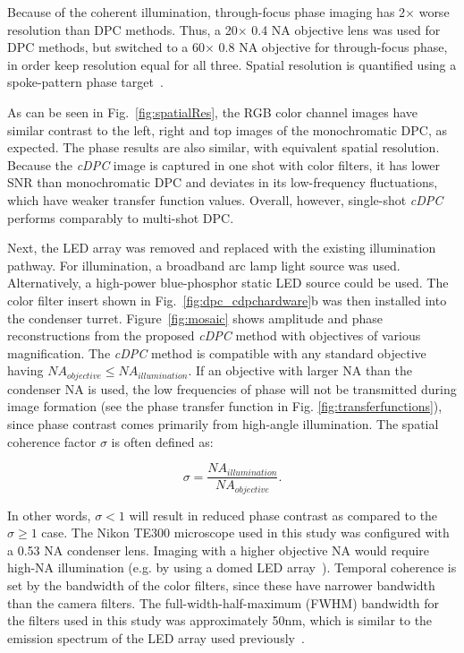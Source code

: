 Because of the coherent illumination, through-focus phase imaging has 2$\times$ worse resolution than DPC methods. Thus, a 20$\times$ 0.4 NA objective lens was used for DPC methods, but switched to a 60$\times$ 0.8 NA objective for through-focus phase, in order keep resolution equal for all three. Spatial resolution is quantified using a spoke-pattern phase target~\cite{standardphaseresolution2016}.

As can be seen in Fig.~\ref{fig:spatialRes}, the RGB color channel images have similar contrast to the left, right and top images of the monochromatic DPC, as expected. The phase results are also similar, with equivalent spatial resolution. Because the \textit{cDPC} image is captured in one shot with color filters, it has lower SNR than monochromatic DPC and deviates in its low-frequency fluctuations, which have weaker transfer function values. Overall, however, single-shot \textit{cDPC} performs comparably to multi-shot DPC.

Next, the LED array was removed and replaced with the existing illumination pathway. For illumination, a broadband arc lamp light source was used. Alternatively, a high-power blue-phosphor static LED source could be used. The color filter insert shown in Fig.~\ref{fig:dpc_cdpchardware}b was then installed into the condenser turret. Figure~\ref{fig:mosaic} shows amplitude and phase reconstructions from the proposed \textit{cDPC} method with objectives of various magnification. The \textit{cDPC} method is compatible with any standard objective having $ NA_{objective}\leq NA_{illumination}$. If an objective with larger NA than the condenser NA is used, the low frequencies of phase will not be transmitted during image formation (see the phase transfer function in Fig. \ref{fig:transferfunctions}), since phase contrast comes primarily from high-angle illumination. The spatial coherence factor $\sigma$ is often defined as:

\begin{equation}
\sigma = \frac{NA_{illumination}}{NA_{objective}}.
\end{equation}

\noindent In other words, $\sigma < 1$ will result in reduced phase contrast as compared to the $\sigma \geq 1$ case. The Nikon TE300 microscope used in this study was configured with a 0.53 NA condenser lens. Imaging with a higher objective NA would require high-NA illumination (e.g. by using a domed LED array~\cite{phillips2015multi}). Temporal coherence is set by the bandwidth of the color filters, since these have narrower bandwidth than the camera filters. The full-width-half-maximum (FWHM) bandwidth for the filters used in this study was approximately 50nm, which is similar to the emission spectrum of the LED array used previously~\cite{tian2015quantitative}.

